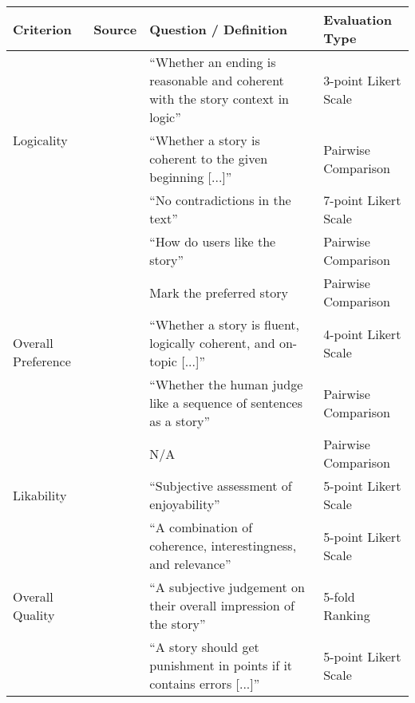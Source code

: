 {    \thispagestyle{empty}
    \begin{landscape}
        \begin{table}
            \small
            \centering
            \begin{tabular}{llll}
                \toprule
                \textbf{Criterion} & \textbf{Source} & \textbf{Question / Definition} & \textbf{Evaluation Type} \\
                \midrule
                \multirow{3}{*}{Logicality} & \citet{guan2019story} & ``Whether an ending is reasonable and coherent with the story context in logic'' & 3-point Likert Scale \\
                & \citet{guan-etal-2020-knowledge} & ``Whether a story is coherent to the given beginning [...]'' & Pairwise Comparison \\
                & \citet{pascual-etal-2021-plug-play} & ``No contradictions in the text'' & 7-point Likert Scale \\
                \midrule
                \multirow{5}{*}{Overall Preference} & \citet{yao2019plan} & ``How do users like the story'' & Pairwise Comparison \\
                & \citet{fan-etal-2019-strategies} & Mark the preferred story & Pairwise Comparison \\
                & \citet{brahman2020modeling} & ``Whether a story is fluent, logically coherent, and on-topic [...]'' & 4-point Likert Scale \\
                & \citet{wang2020narrative} & ``Whether the human judge like a sequence of sentences as a story'' & Pairwise Comparison \\
                & \citet{bai2021semantics} & N/A & Pairwise Comparison \\
                \midrule
                Likability & \citet{akoury2020storium} & ``Subjective assessment of enjoyability'' & 5-point Likert Scale \\
                \midrule
                \multirow{3}{*}{Overall Quality} & \citet{goldfarb-tarrant-etal-2020-content} & ``A combination of coherence, interestingness, and relevance'' & 5-point Likert Scale \\
                & \citet{wilmot2021temporal} & ``A subjective judgement on their overall impression of the story'' & 5-fold Ranking \\
                & \citet{guan2021openmeva} & ``A story should get punishment in points if it contains errors [...]'' & 5-point Likert Scale \\

\end{tabular}
\end{table}
\end{landscape}}
